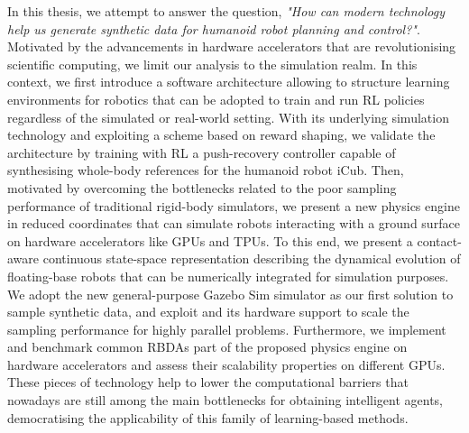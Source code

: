 In this thesis, we attempt to answer the question,
\textit{"How can modern technology help us generate synthetic data for humanoid robot planning and control?"}.\linebreak
Motivated by the advancements in hardware accelerators that are revolutionising scientific computing, we limit our analysis to the simulation realm.
In this context, we first introduce a software architecture allowing to structure learning environments for robotics that can be adopted to train and run \ac{RL} policies regardless of the simulated or real-world setting.
With its underlying simulation technology and exploiting a scheme based on reward shaping, we validate the architecture by
training with \ac{RL} a push-recovery controller capable of synthesising whole-body references for the humanoid robot iCub.
Then, motivated by overcoming the bottlenecks related to the poor sampling performance of traditional rigid-body simulators, we present a new physics engine in reduced coordinates that can simulate robots interacting with a ground surface on hardware accelerators like \acp{GPU} and \acp{TPU}.
To this end, we present a contact-aware continuous state-space representation describing the dynamical evolution of floating-base robots that can be numerically integrated for simulation purposes.
We adopt the new general-purpose Gazebo Sim simulator as our first solution to sample synthetic data, and exploit \jax and its hardware support to scale the sampling performance for highly parallel problems.
Furthermore, we implement and benchmark common \acp{RBDA} part of the proposed physics engine on hardware accelerators and assess their scalability properties on different \acp{GPU}.
These pieces of technology help to lower the computational barriers that nowadays are still among the main bottlenecks for obtaining intelligent agents, democratising the applicability of this family of learning-based methods.

\vfill

\endgroup

\vfill
